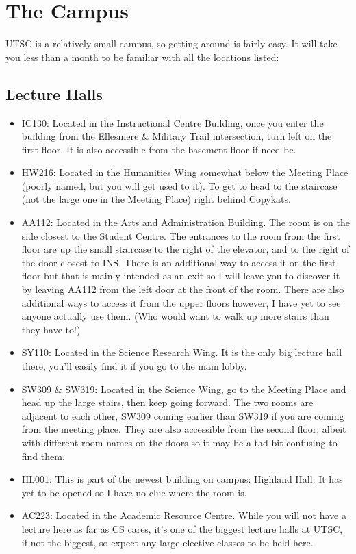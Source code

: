 \documentclass[11pt]{article}
\begin{document}
\section{The Campus}

UTSC is a relatively small campus, so getting around is fairly easy. It
will take you less than a month to be familiar with all the locations
listed:

\subsection{Lecture Halls}
\begin{itemize}
\item IC130: Located in the Instructional Centre Building, once you
    enter the building from the Ellesmere \& Military Trail intersection,
    turn left on the first floor. It is also accessible from the basement
    floor if need be.
\item HW216: Located in the Humanities Wing somewhat below the Meeting
    Place (poorly named, but you will get used to it). To get to head to
    the staircase (not the large one in the Meeting Place) right behind
    Copykats.
\item AA112: Located in the Arts and Administration Building. The room
    is on the side closest to the Student Centre. The entrances to the
    room from the first floor are up the small staircase to the right of
    the elevator, and to the right of the door closest to INS. There is
    an additional way to access it on the first floor but that is mainly
    intended as an exit so I will leave you to discover it by leaving AA112
    from the left door at the front of the room. There are also additional
    ways to access it from the upper floors however, I have yet to see
    anyone actually use them. (Who would want to walk up more stairs than
    they have to!)
\item SY110: Located in the Science Research Wing. It is the only big
    lecture hall there, you'll easily find it if you go to the main lobby.
\item SW309 \& SW319: Located in the Science Wing, go to the Meeting
    Place and head up the large stairs, then keep going forward. The two
    rooms are adjacent to each other, SW309 coming earlier than SW319 if you
    are coming from the meeting place. They are also accessible from the
    second floor, albeit with different room names on the doors so it may be
    a tad bit confusing to find them.
\item HL001: This is part of the newest building on campus: Highland
    Hall. It has yet to be opened so I have no clue where the room is.
\item AC223: Located in the Academic Resource Centre. While you will not
    have a lecture here as far as CS cares, it's one of the biggest lecture
    halls at UTSC, if not the biggest, so expect any large elective classes
    to be held here.
\end{itemize}
\end{document}
